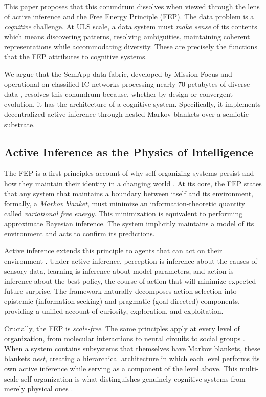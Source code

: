 \documentclass[11pt,a4paper]{article}
\theoremstyle{definition}
\begin{document}
This paper proposes that this conundrum dissolves when viewed through the lens of active inference and the Free Energy Principle (FEP). The data problem is a \emph{cognitive} challenge. At ULS scale, a data system must \emph{make sense} of its contents which means discovering patterns, resolving ambiguities, maintaining coherent representations while accommodating diversity. These are precisely the functions that the FEP attributes to cognitive systems.

We argue that the SemApp data fabric, developed by Mission Focus and operational on classified IC networks processing nearly 70 petabytes of diverse data \citep{yoakumstover2025semapp}, resolves this conundrum because, whether by design or convergent evolution, it has the architecture of a cognitive system. Specifically, it implements decentralized active inference through nested Markov blankets over a semiotic substrate.

\subsection{Active Inference as the Physics of Intelligence}
\label{sec:aif_intro}

The FEP is a first-principles account of why self-organizing systems persist and how they maintain their identity in a changing world \citep{friston2019particular, albarracin2025resilience}. At its core, the FEP states that any system that maintains a boundary between itself and its environment, formally, a \emph{Markov blanket}, must minimize an information-theoretic quantity called \emph{variational free energy}. This minimization is equivalent to performing approximate Bayesian inference. The system implicitly maintains a model of its environment and acts to confirm its predictions.

Active inference extends this principle to agents that can act on their environment \citep{parr2022active}. Under active inference, perception is inference about the causes of sensory data, learning is inference about model parameters, and action is inference about the best policy, the course of action that will minimize expected future surprise. The framework naturally decomposes action selection into epistemic (information-seeking) and pragmatic (goal-directed) components, providing a unified account of curiosity, exploration, and exploitation.

Crucially, the FEP is \emph{scale-free}. The same principles apply at every level of organization, from molecular interactions to neural circuits to social groups \citep{friston2019particular, kirchhoff2018markov, ramstead2023inner}. When a system contains subsystems that themselves have Markov blankets, these blankets \emph{nest}, creating a hierarchical architecture in which each level performs its own active inference while serving as a component of the level above. This multi-scale self-organization is what distinguishes genuinely cognitive systems from merely physical ones \citep{kirchhoff2018markov}.
\end{document}
